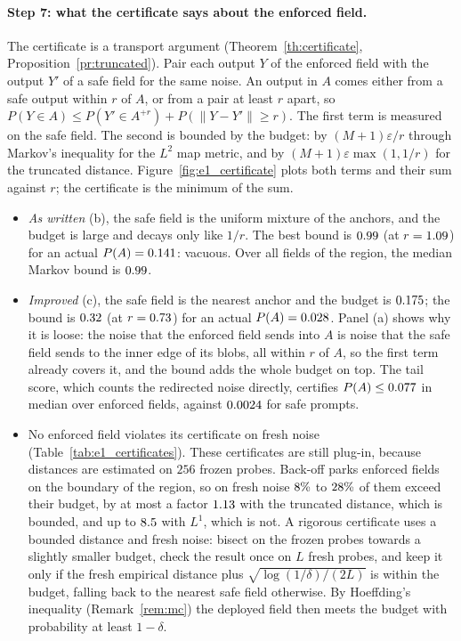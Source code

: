 \documentclass{article}
\theoremstyle{plain}
\theoremstyle{remark}
\begin{document}
\paragraph{Step 7: what the certificate says about the enforced field.}
The certificate is a transport argument (Theorem~\ref{th:certificate}, Proposition~\ref{pr:truncated}). Pair each output $Y$ of the
enforced field with the output $Y'$ of a safe field for the same noise. An output in $A$ comes either from a safe output
within $r$ of $A$, or from a pair at least $r$ apart, so $P(Y\in A)\le P(Y'\in A^{+r})+P(\|Y-Y'\|\ge r)$. The first term is measured
on the safe field. The second is bounded by the budget: by $(M+1)\varepsilon/r$ through Markov's inequality for the $L^2$ map
metric, and by $(M+1)\varepsilon\max(1,1/r)$ for the truncated distance. Figure~\ref{fig:e1_certificate} plots both terms and their sum
against $r$; the certificate is the minimum of the sum.
\begin{itemize}
\item \emph{As written} (b), the safe field is the uniform mixture of the anchors, and the budget is large and decays only
like $1/r$. The best bound is $0.99$ (at $r=1.09$) for an actual $P(A)=0.141$: vacuous. Over all fields of the region,
the median Markov bound is $0.99$.
\item \emph{Improved} (c), the safe field is the nearest anchor and the budget is $0.175$; the bound is $0.32$ (at
$r=0.73$) for an actual $P(A)=0.028$. Panel (a) shows why it is loose: the noise that the enforced field sends into $A$
is noise that the safe field sends to the inner edge of its blobs, all within $r$ of $A$, so the first term already
covers it, and the bound adds the whole budget on top. The tail score, which counts the redirected noise directly,
certifies $P(A)\le0.077$ in median over enforced fields, against $0.0024$ for safe prompts.
\item No enforced field violates its certificate on fresh noise (Table~\ref{tab:e1_certificates}). These certificates are
still plug-in, because distances are estimated on $256$ frozen probes. Back-off parks enforced fields on the boundary
of the region, so on fresh noise $8\%$ to $28\%$ of them exceed their budget, by at most a factor $1.13$ with
the truncated distance, which is bounded, and up to $8.5$ with $L^1$, which is not. A rigorous certificate uses a
bounded distance and fresh noise: bisect on the frozen probes towards a slightly smaller budget, check the result
once on $L$ fresh probes, and keep it only if the fresh empirical distance plus $\sqrt{\log(1/\delta)/(2L)}$ is within the
budget, falling back to the nearest safe field otherwise. By Hoeffding's inequality (Remark~\ref{rem:mc}) the deployed
field then meets the budget with probability at least $1-\delta$.
\end{itemize}
\end{document}
